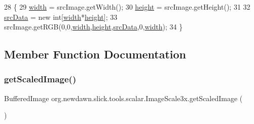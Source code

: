 \begin{DoxyCode}
28     \{
29         \mbox{\hyperlink{classorg_1_1newdawn_1_1slick_1_1tools_1_1scalar_1_1_image_scale3x_a231fbd1dc91babe221fcce1c82d63155}{width}} = srcImage.getWidth();
30         \mbox{\hyperlink{classorg_1_1newdawn_1_1slick_1_1tools_1_1scalar_1_1_image_scale3x_ac2833ff5d8ce6679fed6cbe64efdb5d8}{height}} = srcImage.getHeight();
31         
32         \mbox{\hyperlink{classorg_1_1newdawn_1_1slick_1_1tools_1_1scalar_1_1_image_scale3x_ae5b333101bdebea500fe86161c247eba}{srcData}} = \textcolor{keyword}{new} \textcolor{keywordtype}{int}[\mbox{\hyperlink{classorg_1_1newdawn_1_1slick_1_1tools_1_1scalar_1_1_image_scale3x_a231fbd1dc91babe221fcce1c82d63155}{width}}*\mbox{\hyperlink{classorg_1_1newdawn_1_1slick_1_1tools_1_1scalar_1_1_image_scale3x_ac2833ff5d8ce6679fed6cbe64efdb5d8}{height}}];
33         srcImage.getRGB(0,0,\mbox{\hyperlink{classorg_1_1newdawn_1_1slick_1_1tools_1_1scalar_1_1_image_scale3x_a231fbd1dc91babe221fcce1c82d63155}{width}},\mbox{\hyperlink{classorg_1_1newdawn_1_1slick_1_1tools_1_1scalar_1_1_image_scale3x_ac2833ff5d8ce6679fed6cbe64efdb5d8}{height}},\mbox{\hyperlink{classorg_1_1newdawn_1_1slick_1_1tools_1_1scalar_1_1_image_scale3x_ae5b333101bdebea500fe86161c247eba}{srcData}},0,\mbox{\hyperlink{classorg_1_1newdawn_1_1slick_1_1tools_1_1scalar_1_1_image_scale3x_a231fbd1dc91babe221fcce1c82d63155}{width}});              
34     \}
\end{DoxyCode}


\subsection{Member Function Documentation}
\mbox{\label{classorg_1_1newdawn_1_1slick_1_1tools_1_1scalar_1_1_image_scale3x_a92db926ee3010c6cb98f2ee8f8b7b331}} 
\subsubsection{\texorpdfstring{get\+Scaled\+Image()}{getScaledImage()}}
{\footnotesize\ttfamily Buffered\+Image org.\+newdawn.\+slick.\+tools.\+scalar.\+Image\+Scale3x.\+get\+Scaled\+Image (\begin{DoxyParamCaption}{ }\end{DoxyParamCaption})\hspace{0.3cm}{\ttfamily [inline]}}

